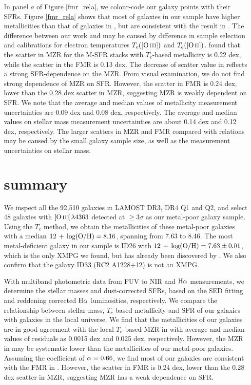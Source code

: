 \documentclass[usenatbib]{raa}
\begin{document}
 
In panel $a$ of Figure \ref{fmr_rela}, 
we colour-code our galaxy points with their SFRs.  
Figure \ref{fmr_rela} shows that most of galaxies in our sample have higher metallicities
than that of galaxies in \cite{2012ApJ...754...98B}, but are consistent  with the
result in
\cite{2013ApJ...765..140A}.   The difference  between our 
work and
\cite{2012ApJ...754...98B} may be caused by difference in sample selection and 
calibrations for electron temperatures $T_e(\hbox{[O\,{\sc iii}]})$ and $T_e(\hbox{[O\,{\sc ii}]})$. 
\cite{2013ApJ...765..140A} found that the scatter in MZR for the M-SFR 
stacks with $T_e$-based metallicity is 0.22 dex, while the scatter in the FMR 
is 0.13 dex. The decrease of scatter value in \cite{2013ApJ...765..140A} 
reflects a strong SFR-dependence on the MZR. From 
visual examination, we do not find 
strong dependence of MZR on SFR. However, the scatter in FMR is 0.24 dex, lower 
than the 0.28 dex 
scatter in MZR, suggesting MZR is weakly dependent on SFR. 
We note that the average and median values of metallicity measurement 
uncertainties are 0.09 dex and 0.08 dex, respectively. The average and 
median values on stellar mass measurement uncertainties are about 0.14 dex and 
0.12 dex, respectively.  The larger scatters in 
MZR and FMR compared with \cite{2013ApJ...765..140A} relations may be caused 
by the small galaxy sample size, as well as the measurement uncertainties on
stellar mass.
  

\section{summary}
\label{summary}  

We inspect all the  92,510 galaxies in LAMOST DR3, DR4 Q1 and Q2, and select  48 galaxies
with $\hbox{[O\,{\sc iii}]}\lambda4363$  detected at $\ge 3 \sigma$ as our metal-poor galaxy sample. 
 Using the $T_e$ method, we obtain the metallicities 
of these metal-poor galaxies 
with a median $\hbox{$12\, +\, {\rm log(O/H)}$} = 8.16$, spanning from 7.63 to  8.46.    
 The most metal-deficient galaxy in
our sample is ID26 with
$\rm \hbox{$12\, +\, {\rm log(O/H)}$}=7.63 \pm 0.01$, which is the only  XMPG we found, 
but has already been  discovered by \cite{2012AA...546A.122I}. We also confirm
that the galaxy ID33 (RC2 A1228+12) is not an XMPG.

With multiband photometric data from FUV to NIR  and $\hbox{H$\alpha$}$ measurements, 
we determine 
the stellar masses and dust-corrected SFRs, based on the SED fitting and 
 reddening corrected $\hbox{H$\alpha$}$ luminosities,
respectively. We compare the relationship between stellar mass, 
$T_e$-based metallicity and 
SFR of our galaxies with galaxies in the local universe.
We find that the metallicities of our galaxies are in good agreement with the 
local $T_e$-based MZR in 
\cite{2013ApJ...765..140A}  with average and median values of 
residuals as 0.0015 dex and 0.025 dex, respectively.
However, the MZR in \cite{2012ApJ...754...98B} may be systematic lower
than the metallicities of
our metal-poor galaxies. Assuming the coefficient of $\rm \alpha =0.66$, 
we find most of our galaxies are consistent with the FMR in \cite{2013ApJ...765..140A}.
 However, the scatter in FMR is 0.24 dex, lower than the 0.28 dex 
scatter in MZR, suggesting MZR has a weak dependence on SFR. 
\end{document}
